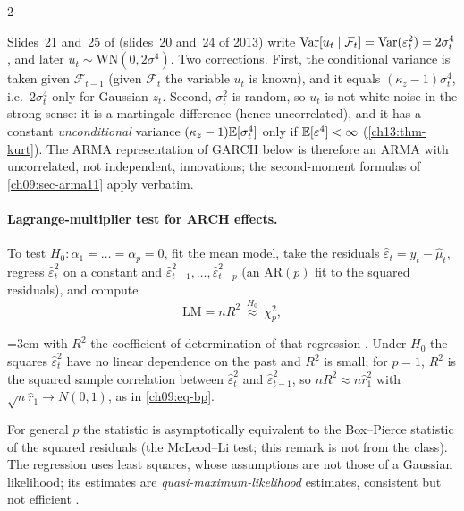 \begin{paracol}{2}
\begin{coursenote}\label{ch13:cn-u}
Slides~21 and~25 of  (slides~20 and~24 of 2013) write $\operatorname{Var}[u_t\mid\mathcal F_t]=\operatorname{Var}(\varepsilon_t^2)=2\sigma_t^4$, and later
$u_t\sim\mathrm{WN}(0,2\sigma^4)$. Two corrections. First, the conditional variance is taken given $\mathcal F_{t-1}$ (given $\mathcal F_t$ the variable $u_t$ is known), and it equals
$(\kappa_z-1)\sigma_t^4$, i.e.\ $2\sigma_t^4$ only for Gaussian $z_t$. Second, $\sigma_t^2$ is random, so $u_t$ is not white noise in the strong sense: it is a martingale difference
(hence uncorrelated), and it has a constant \emph{unconditional} variance $(\kappa_z-1)\mathbb{E}[\sigma_t^4]$ only if $\mathbb{E}[\varepsilon^4]<\infty$ (\cref{ch13:thm-kurt}). The ARMA representation of GARCH below is therefore an
ARMA with uncorrelated, not independent, innovations; the second-moment formulas of \cref{ch09:sec-arma11} apply verbatim.
\end{coursenote}

\paragraph{Lagrange-multiplier test for ARCH effects.} To test $H_0:\alpha_1=\dots=\alpha_p=0$, fit the mean model, take the residuals $\hat\varepsilon_t=y_t-\hat\mu_t$, regress
$\hat\varepsilon_t^2$ on a constant and $\hat\varepsilon^2_{t-1},\dots,\hat\varepsilon^2_{t-p}$ (an AR$(p)$ fit to the squared residuals), and compute
\begin{equation}\label{ch13:eq-lm}
  \mathrm{LM}=nR^2\ \overset{H_0}{\approx}\ \chi^2_p ,
\end{equation}
{\emergencystretch=3em with $R^2$ the coefficient of determination of that regression . Under $H_0$ the squares $\hat\varepsilon_t^2$ have
no linear dependence on the past and $R^2$ is small; for $p=1$, $R^2$ is the squared sample correlation between $\hat\varepsilon_t^2$ and $\hat\varepsilon^2_{t-1}$, so
$nR^2\approx n\hat r_1^2$ with $\sqrt n\hat r_1\to N(0,1)$, as in \cref{ch09:eq-bp}.
\begin{secondary}
For general $p$ the statistic is asymptotically equivalent to the
Box--Pierce statistic of the squared residuals (the McLeod--Li test; this remark is not from the class). The regression uses least squares, whose assumptions are not those of a Gaussian likelihood; its estimates are
\emph{quasi-maximum-likelihood} estimates, consistent but not efficient .
\end{secondary}\par}


\end{paracol}
